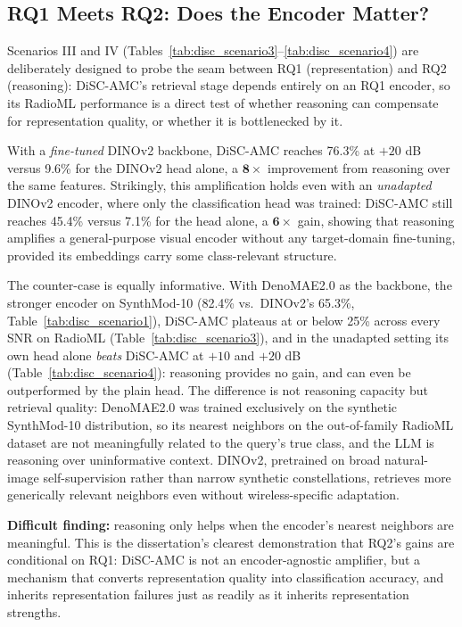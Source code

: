 \subsection{RQ1 Meets RQ2: Does the Encoder Matter?}
\label{sec:rq1_meets_rq2}

Scenarios III and IV (Tables~\ref{tab:disc_scenario3}--\ref{tab:disc_scenario4}) are deliberately designed to probe the seam between RQ1 (representation) and RQ2 (reasoning): DiSC-AMC's retrieval stage depends entirely on an RQ1 encoder, so its RadioML performance is a direct test of whether reasoning can compensate for representation quality, or whether it is bottlenecked by it.

With a \emph{fine-tuned} DINOv2 backbone, DiSC-AMC reaches 76.3\% at $+20$ dB versus 9.6\% for the DINOv2 head alone, a $\mathbf{8\times}$ improvement from reasoning over the same features. Strikingly, this amplification holds even with an \emph{unadapted} DINOv2 encoder, where only the classification head was trained: DiSC-AMC still reaches 45.4\% versus 7.1\% for the head alone, a $\mathbf{6\times}$ gain, showing that reasoning amplifies a general-purpose visual encoder without any target-domain fine-tuning, provided its embeddings carry some class-relevant structure.

The counter-case is equally informative. With DenoMAE2.0 as the backbone, the stronger encoder on SynthMod-10 (82.4\% vs.\ DINOv2's 65.3\%, Table~\ref{tab:disc_scenario1}), DiSC-AMC plateaus at or below 25\% across every SNR on RadioML (Table~\ref{tab:disc_scenario3}), and in the unadapted setting its own head alone \emph{beats} DiSC-AMC at $+10$ and $+20$ dB (Table~\ref{tab:disc_scenario4}): reasoning provides no gain, and can even be outperformed by the plain head. The difference is not reasoning capacity but retrieval quality: DenoMAE2.0 was trained exclusively on the synthetic SynthMod-10 distribution, so its nearest neighbors on the out-of-family RadioML dataset are not meaningfully related to the query's true class, and the LLM is reasoning over uninformative context. DINOv2, pretrained on broad natural-image self-supervision rather than narrow synthetic constellations, retrieves more generically relevant neighbors even without wireless-specific adaptation.

\textbf{Difficult finding:} reasoning only helps when the encoder's nearest neighbors are meaningful. This is the dissertation's clearest demonstration that RQ2's gains are conditional on RQ1: DiSC-AMC is not an encoder-agnostic amplifier, but a mechanism that converts representation quality into classification accuracy, and inherits representation failures just as readily as it inherits representation strengths.

